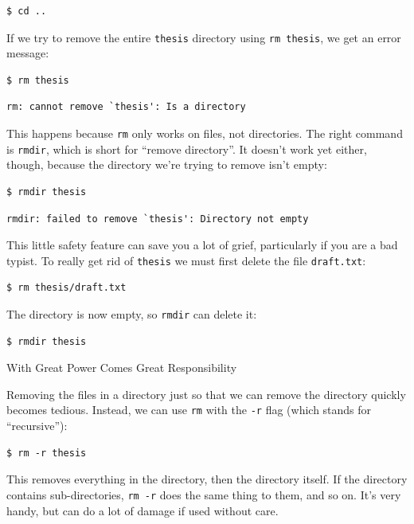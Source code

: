\documentclass{book}
\begin{document}
\begin{verbatim}
$ cd ..
\end{verbatim}

If we try to remove the entire \texttt{thesis} directory using
\texttt{rm thesis}, we get an error message:

\begin{verbatim}
$ rm thesis
\end{verbatim}

\begin{verbatim}
rm: cannot remove `thesis': Is a directory
\end{verbatim}

This happens because \texttt{rm} only works on files, not directories.
The right command is \texttt{rmdir}, which is short for ``remove
directory''. It doesn't work yet either, though, because the directory
we're trying to remove isn't empty:

\begin{verbatim}
$ rmdir thesis
\end{verbatim}

\begin{verbatim}
rmdir: failed to remove `thesis': Directory not empty
\end{verbatim}

This little safety feature can save you a lot of grief, particularly if
you are a bad typist. To really get rid of \texttt{thesis} we must first
delete the file \texttt{draft.txt}:

\begin{verbatim}
$ rm thesis/draft.txt
\end{verbatim}

The directory is now empty, so \texttt{rmdir} can delete it:

\begin{verbatim}
$ rmdir thesis
\end{verbatim}

\begin{swcbox}{With Great Power Comes Great Responsibility}

Removing the files in a directory just so that we can remove the
directory quickly becomes tedious. Instead, we can use \texttt{rm} with
the \texttt{-r} flag (which stands for ``recursive''):

\begin{verbatim}
$ rm -r thesis
\end{verbatim}

This removes everything in the directory, then the directory itself. If
the directory contains sub-directories, \texttt{rm -r} does the same
thing to them, and so on. It's very handy, but can do a lot of damage if
used without care.

\end{swcbox}
\end{document}

